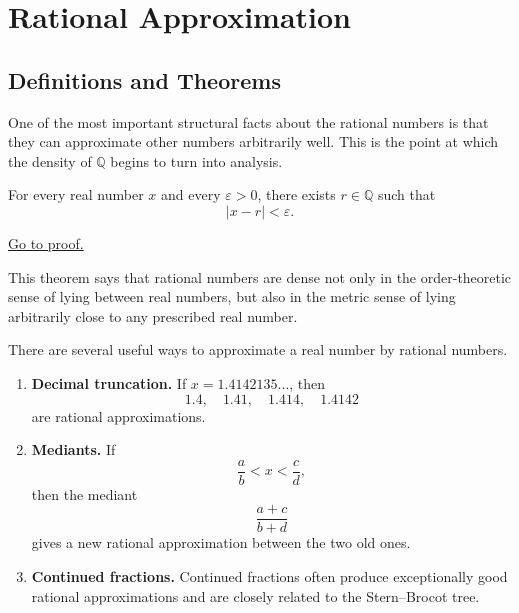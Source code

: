 
\section{Rational Approximation}
\label{sec:rational-approximation}

\subsection{Definitions and Theorems}

One of the most important structural facts about the rational numbers is that they can approximate
other numbers arbitrarily well. This is the point at which the density of $\mathbb{Q}$ begins to turn
into analysis.

\begin{theorem}
\label{thm:rational-approximation}
For every real number $x$ and every $\varepsilon > 0$, there exists $r \in \mathbb{Q}$ such that
\[
|x - r| < \varepsilon.
\]
\end{theorem}

\begin{remark*}[Proof]
\hyperref[prf:rational-approximation]{Go to proof.}
\end{remark*}

\begin{remark}
This theorem says that rational numbers are dense not only in the order-theoretic sense of lying
between real numbers, but also in the metric sense of lying arbitrarily close to any prescribed real
number.
\end{remark}

\begin{remark}
There are several useful ways to approximate a real number by rational numbers.
\begin{enumerate}
    \item \textbf{Decimal truncation.} If $x = 1.4142135\dots$, then
    \[
    1.4, \quad 1.41, \quad 1.414, \quad 1.4142
    \]
    are rational approximations.
    \item \textbf{Mediants.} If
    \[
    \frac{a}{b} < x < \frac{c}{d},
    \]
    then the mediant
    \[
    \frac{a+c}{b+d}
    \]
    gives a new rational approximation between the two old ones.
    \item \textbf{Continued fractions.} Continued fractions often produce exceptionally good rational
    approximations and are closely related to the Stern--Brocot tree.
\end{enumerate}
\end{remark}


